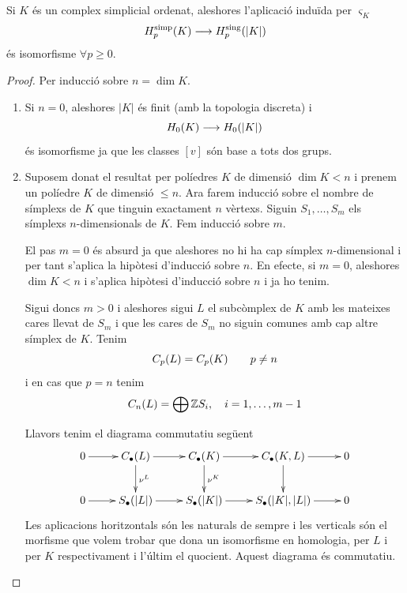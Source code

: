 \documentclass[../main.tex]{subfiles}
\begin{document}
\begin{ter}
Si $K$ és un complex simplicial ordenat, aleshores l'aplicació induïda per $\varsigma_K$
\begin{equation}
    \notag
    H_p^{\mathrm{simp}}(K)\longrightarrow H_p^{\mathrm{sing}}(|K|)    
\end{equation}
és isomorfisme $\forall p\geq 0$.
\end{ter}
\begin{proof}
Per inducció sobre $n = \dim K$.
\begin{enumerate}[(1)]
    \item Si $n= 0$, aleshores $|K|$ és finit (amb la topologia discreta) i 
    \begin{equation}
        \notag
        H_0(K)\longrightarrow H_0(|K|)
    \end{equation}
    és isomorfisme ja que les classes $[v]$ són base a tots dos grups.
    
    \item Suposem donat el resultat per políedres $K$ de dimensió $\dim K<n$ i prenem un políedre $K$ de dimensió $\leq n$. Ara farem inducció sobre el nombre de símplexs de $K$ que tinguin exactament $n$ vèrtexs. Siguin $S_1,\ldots,S_m$ els símplexs $n$-dimensionals de $K$. Fem inducció sobre $m$. 
    
    El pas $m = 0$ és absurd ja que aleshores no hi ha cap símplex $n$-dimensional i per tant s'aplica la hipòtesi d'inducció sobre $n$. En efecte, si $m = 0$, aleshores $\dim K<n$ i s'aplica hipòtesi d'inducció sobre $n$ i ja ho tenim.
    
    Sigui doncs $m>0$ i aleshores sigui $L$ el subcòmplex de $K$ amb les mateixes cares llevat de $S_m$ i que les cares de $S_m$ no siguin comunes amb cap altre símplex de $K$. Tenim
    \begin{equation}
        \notag
        C_p(L) = C_p(K)\qquad p\not =n
    \end{equation}
    i en cas que $p = n$ tenim
    \begin{equation}
        \notag
        C_n(L)=\bigoplus\mathbb{Z}S_i,\quad i=1,\ldots,m-1
    \end{equation}
    
    Llavors tenim el diagrama commutatiu següent
    \begin{equation}
        \notag
        \xymatrix{
        0\ar[r] & C_\bullet(L)\ar[d]^{\nu^L}\ar[r] & C_\bullet(K)\ar[d]^{\nu^K}\ar[r]& C_\bullet(K,L)\ar[d]\ar[r]& 0 \\
        0 \ar[r] & S_\bullet(|L|)\ar[r] & S_\bullet(|K|)\ar[r] & S_\bullet(|K|,|L|)\ar[r] & 0
        }
    \end{equation}
    Les aplicacions horitzontals són les naturals de sempre i les verticals són el morfisme que volem trobar que dona un isomorfisme en homologia, per $L$ i per $K$ respectivament i l'últim el quocient. Aquest diagrama és commutatiu. 
    

\end{enumerate}
\end{proof}
\end{document}
